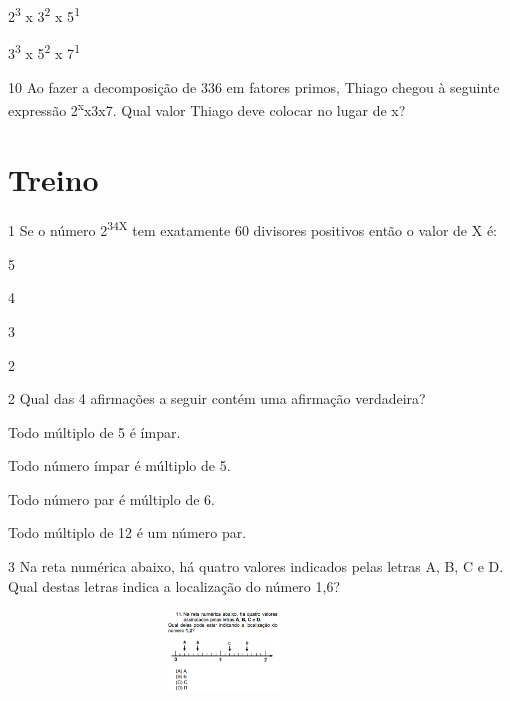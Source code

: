 \begin{escolha}
\item 2\textsuperscript{3} x 3\textsuperscript{2} x 5\textsuperscript{1}  

\reduline{360\hfill}

\item 3\textsuperscript{3} x 5\textsuperscript{2} x 7\textsuperscript{1}

\reduline{4725\hfill}
\end{escolha}

\num{10} Ao fazer a decomposição de 336 em fatores primos, Thiago chegou
à seguinte expressão 2\textsuperscript{x}x3x7. Qual valor Thiago deve 
colocar no lugar de x?

\begin{boxpeq}
\end{boxpeq}

\section{Treino}

\num{1} Se o número 2\textsuperscript{3}\textsuperscript{4}\textsuperscript{X} tem exatamente 60 divisores positivos então o valor de X é:

\begin{escolha}
  \item 5
  \item 4
  \item 3
  \item 2
\end{escolha}

\num{2} Qual das 4 afirmações a seguir contém uma afirmação verdadeira? 

\begin{escolha}
\item
  Todo múltiplo de 5 é ímpar.
\item
  Todo número ímpar é múltiplo de 5.
\item
  Todo número par é múltiplo de 6.
\item
  Todo múltiplo de 12 é um número par. 
\end{escolha}

\num{3} Na reta numérica abaixo, há quatro valores indicados pelas
letras A, B, C e D. Qual destas letras indica a localização do número
1,6?

\begin{figure}
\centering
\includegraphics[width=3.66667in,height=0.85833in]{./_SAEB_9_MAT/media/image31.png}
\end{figure}

